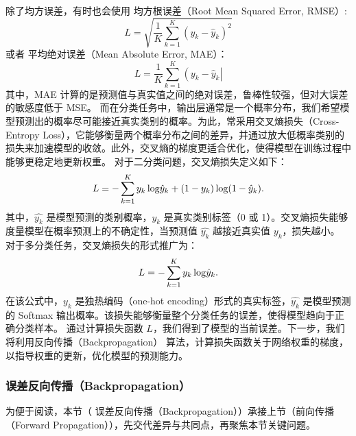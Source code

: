 除了均方误差，有时也会使用 均方根误差（Root Mean Squared Error, RMSE）:
$$
L= \sqrt{\frac{1}{K} \sum_{k=1}^K \left( y_k-\hat y_k \right)^2}
$$
或者 平均绝对误差（Mean Absolute Error, MAE）：
$$
L=\frac{1}{K}  \sum_{k=1}^K \left( y_k-\hat y_k \right|
$$
其中，MAE 计算的是预测值与真实值之间的绝对误差，鲁棒性较强，但对大误差的敏感度低于 MSE。
而在分类任务中，输出层通常是一个概率分布，我们希望模型预测出的概率尽可能接近真实类别的概率。为此，常采用交叉熵损失（Cross-Entropy Loss），它能够衡量两个概率分布之间的差异，并通过放大低概率类别的损失来加速模型的收敛。此外，交叉熵的梯度更适合优化，使得模型在训练过程中能够更稳定地更新权重。
对于二分类问题，交叉熵损失定义如下：
$$
L= -\sum_{k=1}^K y_k\, {\rm log } \hat y_k + (1-y_k) \, {\rm log } (1-\hat y_k).
$$
其中，$\hat{y_k}$ 是模型预测的类别概率，$y_k$ 是真实类别标签（0 或 1）。交叉熵损失能够度量模型在概率预测上的不确定性，当预测值 $\hat{y_k}$ 越接近真实值 $y_k$，损失越小。
对于多分类任务，交叉熵损失的形式推广为：
$$
L= -\sum_{k=1}^K y_k\, {\rm log } \hat y_k.
$$
在该公式中，$y_k$ 是独热编码（one-hot encoding）形式的真实标签，$\hat{y_k}$ 是模型预测的 Softmax 输出概率。该损失能够衡量整个分类任务的误差，使得模型趋向于正确分类样本。
通过计算损失函数 $L$，我们得到了模型的当前误差。下一步，我们将利用反向传播（Backpropagation） 算法，计算损失函数关于网络权重的梯度，以指导权重的更新，优化模型的预测能力。
\subsubsection*{ 误差反向传播（Backpropagation）}
为便于阅读，本节（ 误差反向传播（Backpropagation））承接上节（前向传播（Forward Propagation）），先交代差异与共同点，再聚焦本节关键问题。

